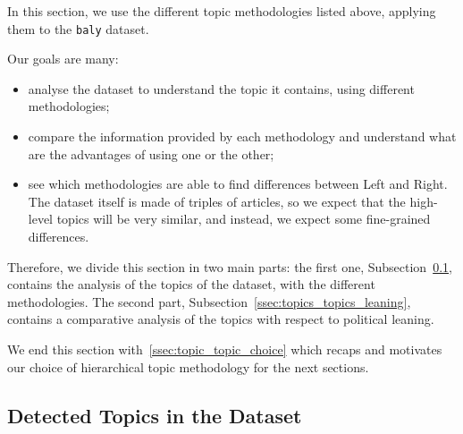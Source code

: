 In this section, we use the different topic methodologies listed above, applying them to the \texttt{baly} dataset.

Our goals are many:

\begin{itemize}
    \item analyse the dataset to understand the topic it contains, using different methodologies;
    \item compare the information provided by each methodology and understand what are the advantages of using one or the other;
    \item see which methodologies are able to find differences between Left and Right. The dataset itself is made of triples of articles, so we expect that the high-level topics will be very similar, and instead, we expect some fine-grained differences.
\end{itemize}

Therefore, we divide this section in two main parts: the first one, Subsection~\ref{ssec:topic_topic_granularities_alone}, contains the analysis of the topics of the dataset, with the different methodologies. The second part, Subsection~\ref{ssec:topics_topics_leaning}, contains a comparative analysis of the topics with respect to political leaning.

We end this section with~\ref{ssec:topic_topic_choice} which recaps and motivates our choice of hierarchical topic methodology for the next sections.



\subsection{\statusgreen Detected Topics in the Dataset}
\label{ssec:topic_topic_granularities_alone}


